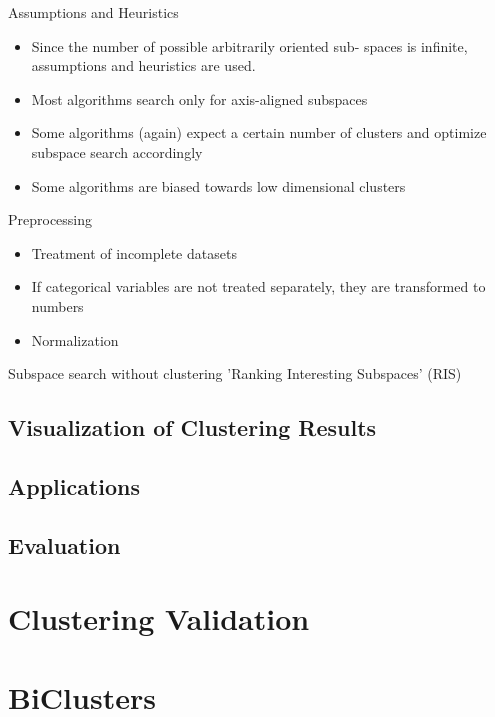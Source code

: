 \documentclass[11pt,ngerman]{article}
\begin{document}
Assumptions and Heuristics
\begin{itemize}
\item Since the number of possible arbitrarily oriented sub-
spaces is infinite, assumptions and heuristics are
used.
\item Most algorithms search only for axis-aligned
subspaces
\item Some algorithms (again) expect a certain number of
clusters and optimize subspace search accordingly
\item Some algorithms are biased towards low
dimensional clusters
\end{itemize}

Preprocessing
\begin{itemize}
\item Treatment of incomplete datasets
\item If categorical variables are not treated separately, they are
transformed to numbers
\item Normalization
\end{itemize}

Subspace search without clustering
'Ranking Interesting Subspaces' (RIS)
\subsection{ Visualization of Clustering Results}

\subsection{Applications}
\subsection{ Evaluation}


\section{Clustering Validation}


\section{BiClusters}

\end{document}
